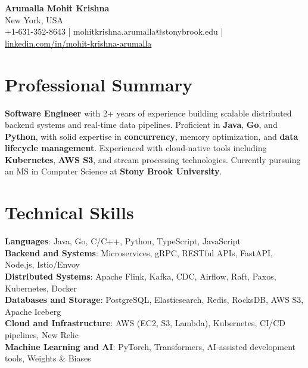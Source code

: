 \documentclass[letterpaper,11pt]{article}
\begin{document}
\begin{center}
  {\Large \textbf{Arumalla Mohit Krishna}} \\
  New York, USA \\
  +1-631-352-8643 \enspace | \enspace mohitkrishna.arumalla@stonybrook.edu \enspace | \enspace \href{https://www.linkedin.com/in/mohit-krishna-arumalla}{linkedin.com/in/mohit-krishna-arumalla}
\end{center}

\section{Professional Summary}
  \begin{itemize}[leftmargin=0.15in, label={}]
    \small{\item{
     \textbf{Software Engineer} with 2+ years of experience building scalable distributed backend systems and real-time data pipelines. Proficient in \textbf{Java}, \textbf{Go}, and \textbf{Python}, with solid expertise in \textbf{concurrency}, memory optimization, and \textbf{data lifecycle management}. Experienced with cloud-native tools including \textbf{Kubernetes}, \textbf{AWS S3}, and stream processing technologies. Currently pursuing an MS in Computer Science at \textbf{Stony Brook University}.
    }}
  \end{itemize}
\vspace{-16pt}

\section{Technical Skills}
 \begin{itemize}[leftmargin=0.15in, label={}]
    \small{\item{
     \textbf{Languages}: Java, Go, C/C++, Python, TypeScript, JavaScript \\
     \textbf{Backend and Systems}: Microservices, gRPC, RESTful APIs, FastAPI, Node.js, Istio/Envoy \\
     \textbf{Distributed Systems}: Apache Flink, Kafka, CDC, Airflow, Raft, Paxos, Kubernetes, Docker \\
     \textbf{Databases and Storage}: PostgreSQL, Elasticsearch, Redis, RocksDB, AWS S3, Apache Iceberg \\
     \textbf{Cloud and Infrastructure}: AWS (EC2, S3, Lambda), Kubernetes, CI/CD pipelines, New Relic \\
     \textbf{Machine Learning and AI}: PyTorch, Transformers, AI-assisted development tools, Weights \& Biases
    }}
 \end{itemize}
\vspace{-16pt}
\end{document}
